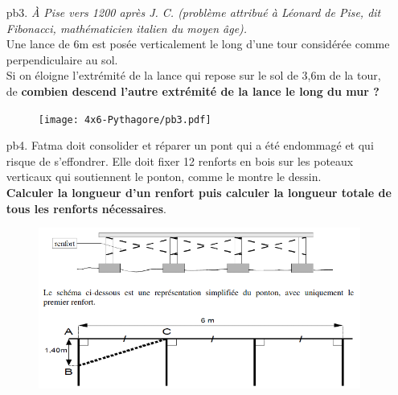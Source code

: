 \begin{multicols}{2}
  \begin{enumerate}
  \item[pb3.] \textit{À Pise vers 1200 après J. C. (problème attribué à Léonard de Pise, dit Fibonacci, mathématicien italien   du moyen âge).} \\
  Une lance de 6m est posée verticalement le long d’une tour considérée comme perpendiculaire au sol. \\
  Si on éloigne l’extrémité de la lance qui repose sur le sol de 3,6m de la tour, de  \textbf{combien descend l’autre extrémité de la lance le long du mur ?}

  \begin{figure}[H]
    \centering
    \texttt{[image: 4x6-Pythagore/pb3.pdf]}
  \end{figure}
\end{enumerate}
\end{multicols}

\begin{enumerate}
  \item[pb4.] Fatma doit consolider et réparer un pont qui a été endommagé et qui risque de s'effondrer. Elle doit fixer 12 renforts en bois sur les poteaux verticaux qui soutiennent le ponton, comme le montre le dessin. \\
    \textbf{Calculer la longueur d'un renfort puis calculer la longueur totale de tous les renforts nécessaires}. 
  
    \begin{figure}[H]
    \centering
    \includegraphics[width=0.8\linewidth]{4x6-Pythagore/pb4.png}
  \end{figure}
\end{enumerate}



